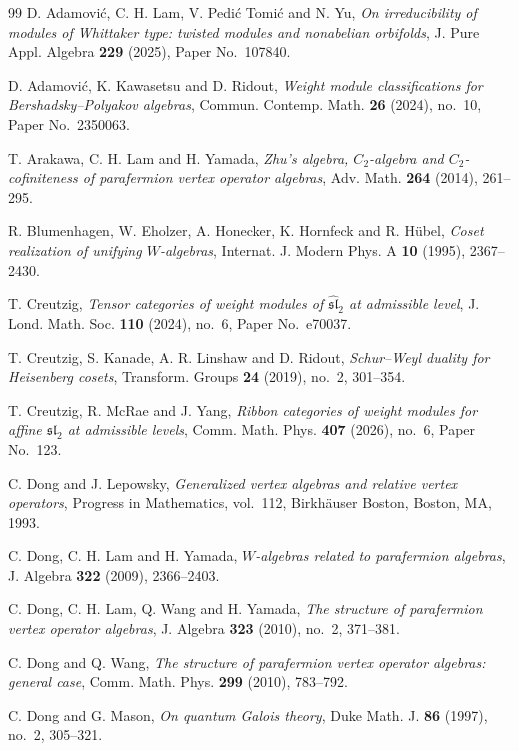 \documentclass[11 pt]{amsart}
\theoremstyle{definition}
\theoremstyle{plain}
\begin{document}
\begin{thebibliography}{99}
D. Adamovi\'c, C. H. Lam, V. Pedi\'c Tomi\'c and N. Yu,
\emph{On irreducibility of modules of Whittaker type: twisted modules and
nonabelian orbifolds},
J. Pure Appl. Algebra \textbf{229} (2025), Paper No.~107840.


D. Adamovi\'c, K. Kawasetsu and D. Ridout,
\emph{Weight module classifications for Bershadsky--Polyakov algebras},
Commun. Contemp. Math. \textbf{26} (2024), no.~10,
Paper No.~2350063.

T. Arakawa, C. H. Lam and H. Yamada,
\emph{Zhu's algebra, $C_2$-algebra and $C_2$-cofiniteness of parafermion vertex operator algebras},
Adv. Math. \textbf{264} (2014), 261--295.


R. Blumenhagen, W. Eholzer, A. Honecker, K. Hornfeck and R. H\"ubel,
\emph{Coset realization of unifying $W$-algebras},
Internat. J. Modern Phys. A \textbf{10} (1995), 2367--2430.

T. Creutzig,
\emph{Tensor categories of weight modules of
$\widehat{\mathfrak{sl}}_2$ at admissible level},
J. Lond. Math. Soc. \textbf{110} (2024), no.~6,
Paper No.~e70037.



T. Creutzig, S. Kanade, A. R. Linshaw and D. Ridout,
\emph{Schur--Weyl duality for Heisenberg cosets},
Transform. Groups \textbf{24} (2019), no.~2, 301--354.


T. Creutzig, R. McRae and J. Yang,
\emph{Ribbon categories of weight modules for affine
$\mathfrak{sl}_2$ at admissible levels},
Comm. Math. Phys. \textbf{407} (2026), no.~6,
Paper No.~123.

C. Dong and J. Lepowsky,
\emph{Generalized vertex algebras and relative vertex operators},
Progress in Mathematics, vol.~112,
Birkh\"auser Boston, Boston, MA, 1993.


C. Dong, C. H. Lam and H. Yamada,
\emph{$W$-algebras related to parafermion algebras},
J. Algebra \textbf{322} (2009), 2366--2403.

C. Dong, C. H. Lam, Q. Wang and H. Yamada,
\emph{The structure of parafermion vertex operator algebras},
J. Algebra \textbf{323} (2010), no.~2, 371--381.


 C. Dong and Q. Wang, \emph{The structure of parafermion vertex operator algebras: general case}, Comm. Math. Phys.
 \textbf {299} (2010), 783--792.


C. Dong and G. Mason,
\emph{On quantum Galois theory},
Duke Math. J. \textbf{86} (1997), no.~2, 305--321.



\end{thebibliography}
\end{document}
